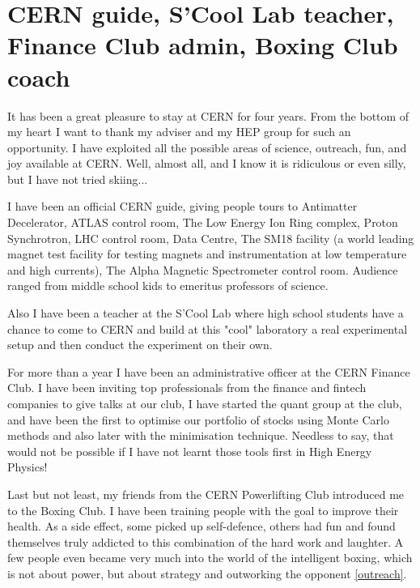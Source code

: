 \clearpage

\section*{CERN guide, S'Cool Lab teacher, Finance Club admin, Boxing Club coach}
\small

It has been a great pleasure to stay at CERN for four years. From the bottom of my heart I want to thank my adviser and my HEP group for such an opportunity. I have exploited all the possible areas of science, outreach, fun, and joy available at CERN. Well, almost all, and I know it is ridiculous or even silly, but I have not tried skiing...

I have been an official CERN guide, giving people tours to Antimatter Decelerator, ATLAS control room, The Low Energy Ion Ring complex, Proton Synchrotron, LHC control room, Data Centre, The SM18 facility (a world leading magnet test facility for testing magnets and instrumentation at low temperature and high currents), The Alpha Magnetic Spectrometer control room. Audience ranged from middle school kids to emeritus professors of science. 

Also I have been a teacher at the S'Cool Lab where high school students have a chance to come to CERN and build at this "cool" laboratory a real experimental setup and then conduct the experiment on their own. 

For more than a year I have been an administrative officer at the CERN Finance Club. I have been inviting top professionals from the finance and fintech companies to give talks at our club, I have started the quant group at the club, and have been the first to optimise our portfolio of stocks using Monte Carlo methods and also later with the minimisation technique. Needless to say, that would not be possible if I have not learnt those tools first in High Energy Physics!

Last but not least, my friends from the CERN Powerlifting Club introduced me to the Boxing Club. I have been training people with the goal to improve their health. As a side effect, some picked up self-defence, others had fun and found themselves truly addicted to this combination of the hard work and laughter. A few people even became very much into the world of the intelligent boxing, which is not about power, but about strategy and outworking the opponent \ref{outreach}. 



